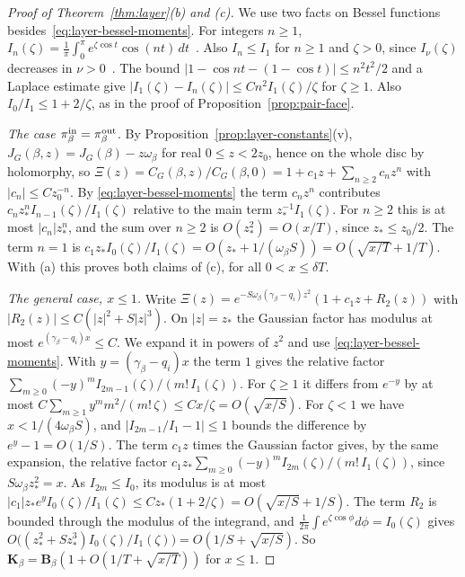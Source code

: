 \begin{proof}[Proof of Theorem~\ref{thm:layer}\textup{(b)} and \textup{(c)}]
We use two facts on Bessel functions besides~\eqref{eq:layer-bessel-moments}. For integers
$n\ge1$, $I_n(\zeta)=\frac1\pi\int_0^\pi e^{\zeta\cos t}\cos(nt)\,dt$~\cite[Eq.~10.32.3]{dlmf}.
Also $I_n\le I_1$ for $n\ge1$ and $\zeta>0$, since $I_\nu(\zeta)$ decreases in $\nu>0$~\cite[\S10.37]{dlmf}. The bound $|1-\cos nt-(1-\cos t)|\le n^2t^2/2$ and a Laplace
estimate give $|I_1(\zeta)-I_n(\zeta)|\le Cn^2I_1(\zeta)/\zeta$ for $\zeta\ge1$. Also
$I_0/I_1\le1+2/\zeta$, as in the proof of Proposition~\ref{prop:pair-face}.

\emph{The case $\pi^{\rm in}_\beta=\pi^{\rm out}_\beta$.} By
Proposition~\ref{prop:layer-constants}(v), $J_G(\beta,z)=J_G(\beta)-z\omega_\beta$ for real
$0\le z<2z_0$, hence on the whole disc by holomorphy, so
$\Xi(z)=C_G(\beta,z)/C_G(\beta,0)=1+c_1z+\sum_{n\ge2}c_nz^n$ with $|c_n|\le Cz_0^{-n}$. By
\eqref{eq:layer-bessel-moments} the term $c_nz^n$ contributes $c_nz_*^nI_{n-1}(\zeta)/I_1(\zeta)$
relative to the main term $z_*^{-1}I_1(\zeta)$. For $n\ge2$ this is at most $|c_n|z_*^n$, and the
sum over $n\ge2$ is $O(z_*^2)=O(x/T)$, since $z_*\le z_0/2$. The term $n=1$ is
$c_1z_*I_0(\zeta)/I_1(\zeta)=O(z_*+1/(\omega_\beta S))=O(\sqrt{x/T}+1/T)$. With (a) this proves
both claims of (c), for all $0<x\le\delta T$.

\emph{The general case, $x\le1$.} Write $\Xi(z)=e^{-S\omega_\beta(\gamma_\beta-q_i)z^2}(1+c_1z+R_2(z))$
with $|R_2(z)|\le C(|z|^2+S|z|^3)$. On $|z|=z_*$ the Gaussian factor has modulus at most
$e^{(\gamma_\beta-q_i)x}\le C$. We expand it in powers of $z^2$ and use
\eqref{eq:layer-bessel-moments}. With $y=(\gamma_\beta-q_i)x$ the term $1$ gives the relative
factor $\sum_{m\ge0}(-y)^mI_{2m-1}(\zeta)/(m!\,I_1(\zeta))$. For $\zeta\ge1$ it differs from
$e^{-y}$ by at most $C\sum_{m\ge1}y^mm^2/(m!\,\zeta)\le Cx/\zeta=O(\sqrt{x/S})$. For $\zeta<1$
we have $x<1/(4\omega_\beta S)$, and $|I_{2m-1}/I_1-1|\le1$ bounds the difference by
$e^y-1=O(1/S)$. The term $c_1z$ times the Gaussian factor gives, by the same expansion, the
relative factor $c_1z_*\sum_{m\ge0}(-y)^mI_{2m}(\zeta)/(m!\,I_1(\zeta))$, since
$S\omega_\beta z_*^2=x$. As $I_{2m}\le I_0$, its modulus is at most
$|c_1|z_*e^yI_0(\zeta)/I_1(\zeta)\le Cz_*(1+2/\zeta)=O(\sqrt{x/S}+1/S)$.
The term $R_2$ is bounded through the modulus of the integrand, and
$\frac1{2\pi}\int e^{\zeta\cos\phi}d\phi=I_0(\zeta)$ gives
$O\bigl((z_*^2+Sz_*^3)I_0(\zeta)/I_1(\zeta)\bigr)=O(1/S+\sqrt{x/S})$. So
$\mathbf K_\beta=\mathbf B_\beta(1+O(1/T+\sqrt{x/T}))$ for $x\le1$.


\end{proof}
